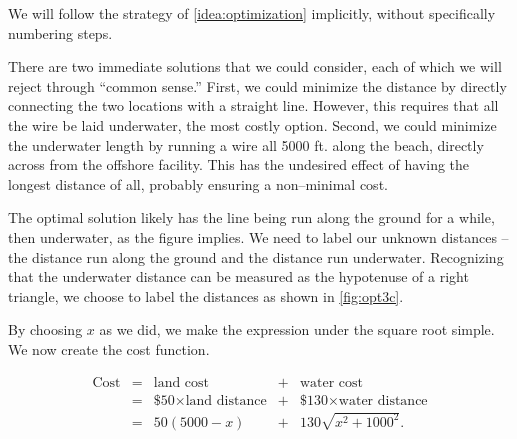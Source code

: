 
{We will follow the strategy of \autoref{idea:optimization} implicitly, without specifically numbering steps.

There are two immediate solutions that we could consider, each of which we will reject through ``common sense.'' First, we could minimize the distance by directly connecting the two locations with a straight line. However, this requires that all the wire be laid underwater, the most costly option. Second, we could minimize the underwater length by running a wire all 5000 ft. along the beach, directly across from the offshore facility. This has the undesired effect of having the longest distance of all, probably ensuring a non--minimal cost.

The optimal solution likely has the line being run along the ground for a while, then underwater, as the figure implies. We need to label our unknown distances -- the distance run along the ground and the distance run underwater. Recognizing that the underwater distance can be measured as the hypotenuse of a right triangle, we choose to label the distances as shown in \autoref{fig:opt3c}.


By choosing $x$ as we did, we make the expression under the square root simple. We now create the cost function. 

\[
\begin{array}{ccccc}
	\text{Cost} &=&  \text{land cost} &+ & \text{water cost} \\
	&=& \text{\$50}\times \text{land distance} &+& \text{\$130}\times \text{water distance} \\
	&=& 50(5000-x) &+& 130\sqrt{x^2+1000^2}.\\
\end{array}
\]

}
